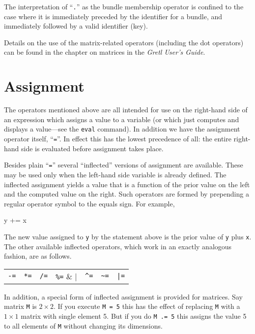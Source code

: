 The interpretation of ``\texttt{.}'' as the bundle membership operator
is confined to the case where it is immediately preceded by the
identifier for a bundle, and immediately followed by a valid
identifier (key).

Details on the use of the matrix-related operators (including the dot
operators) can be found in the chapter on matrices in the
\textit{Gretl User's Guide}.

\section{Assignment}

The operators mentioned above are all intended for use on the
right-hand side of an expression which assigns a value to a variable
(or which just computes and displays a value---see the \texttt{eval}
command). In addition we have the assignment operator itself,
``\texttt{=}''. In effect this has the lowest precedence of all: the
entire right-hand side is evaluated before assignment takes place.

Besides plain ``\texttt{=}'' several ``inflected'' versions of
assignment are available. These may be used only when the left-hand
side variable is already defined. The inflected assignment yields a
value that is a function of the prior value on the left and the
computed value on the right. Such operators are formed by prepending a
regular operator symbol to the equals sign. For example,
%
\begin{code}
y += x
\end{code}
%
The new value assigned to \texttt{y} by the statement above is the
prior value of \texttt{y} plus \texttt{x}. The other available
inflected operators, which work in an exactly analogous fashion, are
as follows.

\begin{center}
\begin{tabular}{ccccccc}
\texttt{-=} & \texttt{*=} & \texttt{/=} & \verb|%=| & 
  \verb|^=| & \verb|~=| & \verb+|=+ \\
\end{tabular}
\end{center}

In addition, a special form of inflected assignment is provided for
matrices. Say matrix \texttt{M} is $2 \times 2$. If you execute
\texttt{M = 5} this has the effect of replacing \texttt{M} with a $1
\times 1$ matrix with single element 5. But if you do \texttt{M .= 5}
this assigns the value 5 to all elements of \texttt{M} without
changing its dimensions.

